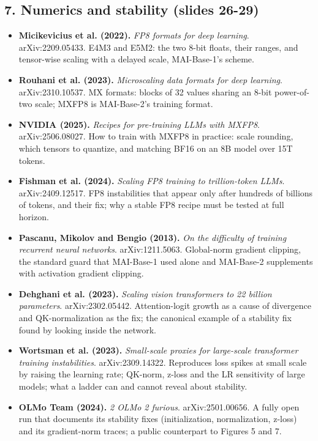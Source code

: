 \documentclass[11pt,letterpaper]{article}
\begin{document}
\subsection*{7. Numerics and stability (slides 26-29)}
\begin{itemize}[leftmargin=1.2em,itemsep=3pt]\sloppy
\item \textbf{Micikevicius et al. (2022).} \textit{FP8 formats for deep learning}. arXiv:2209.05433. E4M3 and E5M2: the two 8-bit floats, their ranges, and tensor-wise scaling with a delayed scale, MAI-Base-1's scheme.
\item \textbf{Rouhani et al. (2023).} \textit{Microscaling data formats for deep learning}. arXiv:2310.10537. MX formats: blocks of 32 values sharing an 8-bit power-of-two scale; MXFP8 is MAI-Base-2's training format.
\item \textbf{NVIDIA (2025).} \textit{Recipes for pre-training LLMs with MXFP8}. arXiv:2506.08027. How to train with MXFP8 in practice: scale rounding, which tensors to quantize, and matching BF16 on an 8B model over 15T tokens.
\item \textbf{Fishman et al. (2024).} \textit{Scaling FP8 training to trillion-token LLMs}. arXiv:2409.12517. FP8 instabilities that appear only after hundreds of billions of tokens, and their fix; why a stable FP8 recipe must be tested at full horizon.
\item \textbf{Pascanu, Mikolov and Bengio (2013).} \textit{On the difficulty of training recurrent neural networks}. arXiv:1211.5063. Global-norm gradient clipping, the standard guard that MAI-Base-1 used alone and MAI-Base-2 supplements with activation gradient clipping.
\item \textbf{Dehghani et al. (2023).} \textit{Scaling vision transformers to 22 billion parameters}. arXiv:2302.05442. Attention-logit growth as a cause of divergence and QK-normalization as the fix; the canonical example of a stability fix found by looking inside the network.
\item \textbf{Wortsman et al. (2023).} \textit{Small-scale proxies for large-scale transformer training instabilities}. arXiv:2309.14322. Reproduces loss spikes at small scale by raising the learning rate; QK-norm, z-loss and the LR sensitivity of large models; what a ladder can and cannot reveal about stability.
\item \textbf{OLMo Team (2024).} \textit{2 OLMo 2 furious}. arXiv:2501.00656. A fully open run that documents its stability fixes (initialization, normalization, z-loss) and its gradient-norm traces; a public counterpart to Figures 5 and 7.
\end{itemize}
\end{document}
